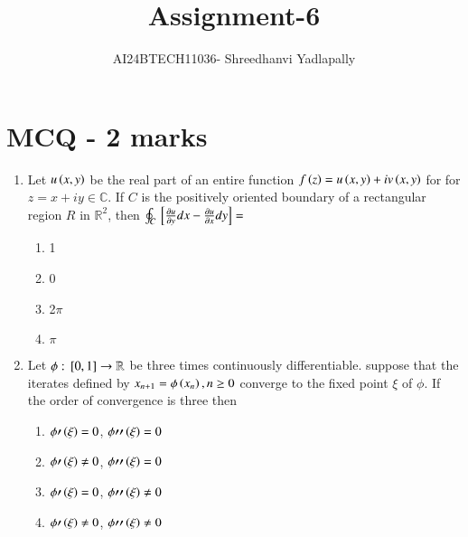 \documentclass[journal,12pt,onecolumn]{IEEEtran}
\theoremstyle{remark}
\begin{document}

\vspace{3cm}

\title{Assignment-6}
\author{AI24BTECH11036- Shreedhanvi Yadlapally}
\maketitle

\bigskip
\renewcommand{\thefigure}{\theenumi}
\renewcommand{\thetable}{\theenumi}
\section{MCQ - 2 marks}
\begin{enumerate}

	\item Let $u\left(x,y\right)$ be the real part of an entire function $f\left(z\right)=u\left(x,y\right)+iv\left(x,y\right)$ for for $z=x+iy\in \mathbb{C}$. If $C$ is the positively oriented boundary of a rectangular region $R$ in $\mathbb{R}^{2}$, then $\oint_{C}{}\left[\frac{\partial u}{\partial y}dx-\frac{\partial u}{\partial x}dy\right]=$
	\begin{multicols}{4}
	\begin{enumerate}
		\item 1
		\item 0
		\item 2$\pi$
		\item $\pi$
	\end{enumerate}
        \end{multicols}

	\item Let $\phi :{}\left[0,1\right]\to \mathbb{R}$ be three times continuously differentiable. suppose that the iterates defined by $x_{n+1}=\phi \left(x_{n}\right), n\geq 0$ converge to the fixed point $\xi$ of $\phi$. If the order of convergence is three then
	\begin{multicols}{2}
	\begin{enumerate}
		\item $\phi \prime \left(\xi\right)=0$, $\phi \prime \prime \left(\xi\right)=0$
		\item $\phi \prime \left(\xi\right)\neq 0$, $\phi \prime \prime \left(\xi\right)=0$
		\item $\phi \prime \left(\xi\right)=0$, $\phi \prime \prime \left(\xi\right)\neq 0$ 
		\item $\phi \prime \left(\xi\right)\neq 0$, $\phi \prime \prime \left(\xi\right)\neq 0$
	\end{enumerate}
	\end{multicols}


\end{enumerate}
\end{document}
